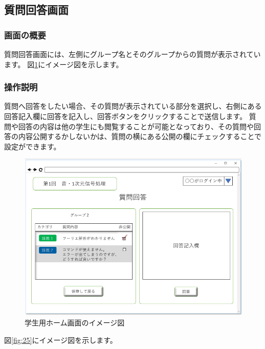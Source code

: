 \subsection{質問回答画面}
\subsubsection{画面の概要}
質問回答画面には、左側にグループ名とそのグループからの質問が表示されています。
図\ref{fig:24}にイメージ図を示します。

\subsubsection{操作説明}
質問へ回答をしたい場合、その質問が表示されている部分を選択し、右側にある回答記入欄に回答を記入し、回答ボタンをクリックすることで送信します。
質問や回答の内容は他の学生にも閲覧することが可能となっており、その質問や回答の内容公開するかしないかは、質問の横にある公開の欄にチェックすることで設定ができます。

\begin{figure}[phtbp]
  \begin{center}
    \includegraphics[width=1\linewidth,clip]{./img/24.png}
    \caption{学生用ホーム画面のイメージ図}\label{fig:24}
  \end{center}
\end{figure}

図\ref{fig:25}にイメージ図を示します。

